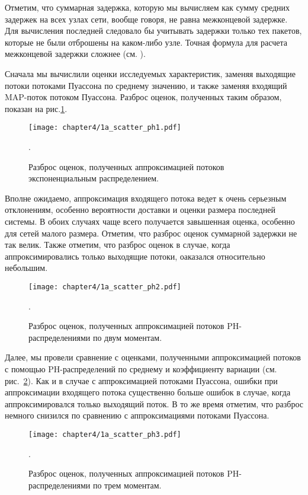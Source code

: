 Отметим, что суммарная задержка, которую мы вычисляем как сумму средних задержек на всех узлах сети, вообще говоря, не равна межконцевой задержке. Для вычисления последней следовало бы учитывать задержки только тех пакетов, которые не были отброшены на каком-либо узле. Точная формула для расчета межконцевой задержки сложнее (см. \cite[p.~429]{DudinBook2019}).

Сначала мы вычислили оценки исследуемых характеристик, заменяя выходящие потоки потоками Пуассона по среднему значению, и также заменяя входящий MAP-поток потоком Пуассона. Разброс оценок, полученных таким образом, показан на рис.\ref{fig:results-approx-ph1}.

\begin{figure}[h]
    \texttt{[image: chapter4/1a\_scatter\_ph1.pdf]}
    \caption{Разброс оценок, полученных аппроксимацией потоков экспоненциальным распределением.}.\label{fig:results-approx-ph1}
\end{figure}

Вполне ожидаемо, аппроксимация входящего потока ведет к очень серьезным отклонениям, особенно вероятности доставки и оценки размера последней системы. В обоих случаях чаще всего получается завышенная оценка, особенно для сетей малого размера. Отметим, что разброс оценок суммарной задержки не так велик. Также отметим, что разброс оценок в случае, когда аппроксимировались только выходящие потоки, оаказался относительно небольшим.

\begin{figure}[h]
    \texttt{[image: chapter4/1a\_scatter\_ph2.pdf]}
    \caption{Разброс оценок, полученных аппроксимацией потоков PH-распределениями по двум моментам.}.\label{fig:results-approx-ph2}
\end{figure}

Далее, мы провели сравнение с оценками, полученными аппроксимацией потоков с помощью PH-распределений по среднему и коэффициенту вариации (см. рис.~\ref{fig:results-approx-ph2}). Как и в случае с аппроксимацией потоками Пуассона, ошибки при аппроксимации входящего потока существенно больше ошибок в случае, когда аппроксимировался только выходящий поток. В то же время отметим, что разброс немного снизился по сравнению с аппроксимациями потоками Пуассона.

\begin{figure}[h]
    \texttt{[image: chapter4/1a\_scatter\_ph3.pdf]}
    \caption{Разброс оценок, полученных аппроксимацией потоков PH-распределениями по трем моментам.}.\label{fig:results-approx-ph3}
\end{figure}

